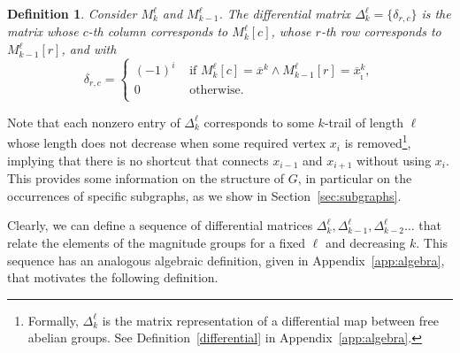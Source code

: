 \documentclass{article}
\newtheorem{definition}{Definition}
\begin{document}
	\begin{definition}
		\label{def:dif_matrix}
		Consider $M_{k}^{\ell}$ and $M_{k-1}^{\ell}$. The \emph{differential matrix} $\Delta_k^\ell=\{\delta_{r,c}\}$ is the matrix whose $c$-th column corresponds to $M_{k}^{\ell}[c]$, whose $r$-th row corresponds to $M_{k-1}^{\ell}[r]$, and with 
		\[\delta_{r,c}=\begin{cases}
			(-1)^{i} &\text{ if } M_{k}^{\ell}[c]=\overline{x}^k \land M_{k-1}^{\ell}[r]=\overline{x}_{\hat{\imath}}^k, \\
			0 &\text{ otherwise.}\\
		\end{cases}
		\]
	\end{definition}
	Note that each nonzero entry of $\Delta_k^\ell$ corresponds to some $k$-trail of length $\ell$ whose length does not decrease when some required vertex $x_i$ is removed\footnote{Formally, $\Delta_k^\ell$ is the matrix representation of a differential map between free abelian groups. 
		See Definition~\ref{differential} in Appendix~\ref{app:algebra}.}, implying that there is no shortcut that connects $x_{i-1}$ and $x_{i+1}$ without using $x_i$. 
	This provides some information on the structure of $G$, in particular on the occurrences of specific subgraphs, as we show in Section~\ref{sec:subgraphs}.
	
	Clearly, we can define a sequence of differential matrices $\Delta_k^\ell, \Delta_{k-1}^\ell, \Delta_{k-2}^\ell\ldots$ that relate the elements of the magnitude groups for a fixed $\ell$ and decreasing $k$. 
	This sequence has an analogous algebraic definition, given in Appendix~\ref{app:algebra}, that motivates the following definition.
	
\end{document}

